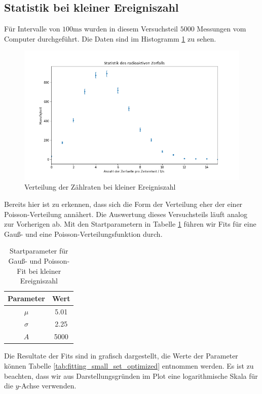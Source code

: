 \subsection{Statistik bei kleiner Ereigniszahl}

Für Intervalle von $100\si{\milli\second}$ wurden in diesem Versuchsteil $5000$ Messungen vom Computer durchgeführt. Die Daten sind im Histogramm \ref{plot:aufgabe5_data} zu sehen.

\begin{figure}[H]
  \centering
  \includegraphics[width=.9\textwidth]{files/aufgabe5_data.png}
  \caption{Verteilung der Zählraten bei kleiner Ereigniszahl}
  \label{plot:aufgabe5_data}
\end{figure}

Bereits hier ist zu erkennen, dass sich die Form der Verteilung eher der einer Poisson-Verteilung annähert. Die Auswertung dieses Versuchsteils läuft analog zur Vorherigen ab. Mit den Startparametern in Tabelle \ref{tab:fitting_small_set_start_params} führen wir Fits für eine Gauß- und eine Poisson-Verteilungsfunktion durch.

\renewcommand{\arraystretch}{1.3}
\begin{table}[H]
  \centering
  \begin{tabular}{c|c}
    Parameter & Wert\\\hline
    $\mu$ & 5.01\\
    $\sigma$ & 2.25\\
    $A$ & 5000
  \end{tabular}
  \caption{Startparameter für Gauß- und Poisson-Fit bei kleiner Ereigniszahl}
  \label{tab:fitting_small_set_start_params}
\end{table}
\renewcommand{\arraystretch}{1}

Die Resultate der Fits sind in  grafisch dargestellt, die Werte der Parameter können Tabelle \ref{tab:fitting_small_set_optimized} entnommen werden. Es ist zu beachten, dass wir aus Darstellungsgründen im Plot eine logarithmische Skala für die $y$-Achse verwenden.

